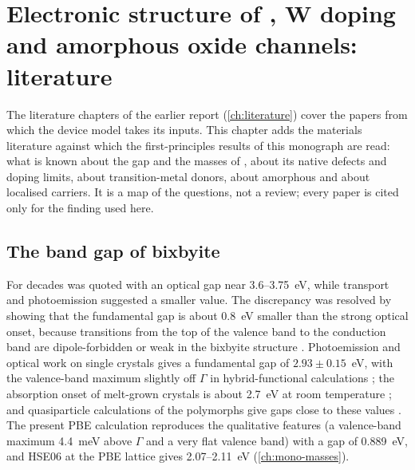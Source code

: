 \chapter{Electronic structure of \texorpdfstring{\InO}{In2O3}, W doping and amorphous oxide channels: literature}
\label{ch:mono-lit-materials}

The literature chapters of the earlier report (\cref{ch:literature}) cover the papers from which the device model takes
its inputs. This chapter adds the materials literature against which the first-principles results of this monograph
are read: what is known about the gap and the masses of \InO{}, about its native defects and doping limits, about
transition-metal donors, about amorphous \InO{} and about localised carriers. It is a map of the questions, not a
review; every paper is cited only for the finding used here.

\section{The band gap of bixbyite \texorpdfstring{\InO}{In2O3}}
\label{sec:mono-lit-gap}

For decades \InO{} was quoted with an optical gap near 3.6--3.75~eV, while transport and photoemission suggested a
smaller value. The discrepancy was resolved by showing that the fundamental gap is about 0.8~eV smaller than the
strong optical onset, because transitions from the top of the valence band to the conduction band are dipole-forbidden
or weak in the bixbyite structure \citep{Walsh2008}. Photoemission and optical work on single crystals gives a
fundamental gap of $2.93\pm0.15$~eV, with the valence-band maximum slightly off $\Gamma$ in hybrid-functional
calculations \citep{King2009}; the absorption onset of melt-grown crystals is about 2.7~eV at room temperature
\citep{Irmscher2014}; and quasiparticle calculations of the \InO{} polymorphs give gaps close to these values
\citep{Fuchs2008}. The present PBE calculation reproduces the qualitative features (a valence-band maximum 4.4~meV above
$\Gamma$ and a very flat valence band) with a gap of 0.889~eV, and HSE06 at the PBE lattice gives 2.07--2.11~eV
(\cref{ch:mono-masses}).

